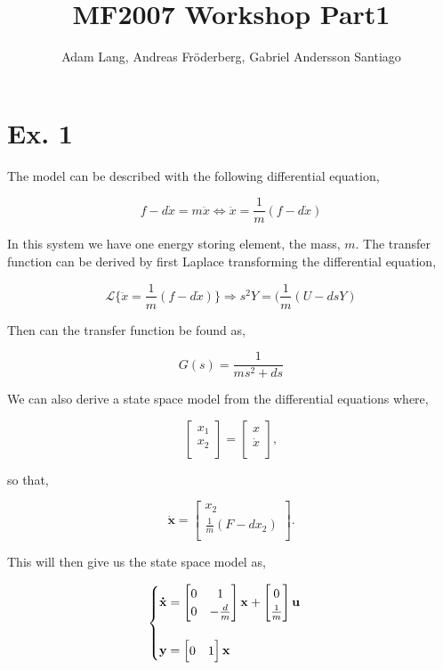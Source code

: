 \documentclass[12pt,a4paper]{article}
\title{MF2007 Workshop Part1}
\author{Adam Lang, Andreas Fr\"{o}derberg, Gabriel Andersson Santiago}
\newcounter{eq}
\newcommand{\eq}[1]{
\begin{equation}
        #1
\end{equation}
    }
\begin{document}
\maketitle
\section{Ex. 1}
  The model can be described with the following differential equation,
  \eq{
  f-d\dot{x}=m\ddot{x}\Leftrightarrow \ddot{x}=\frac{1}{m}(f-d\dot{x})
  }
  In this system we have one energy storing element, the mass, $m$. The
  transfer function can be derived by first Laplace transforming the
  differential equation,
  \eq{
  \mathscr{L}\{\ddot{x}=\frac{1}{m}(f-d\dot{x})\}\Rightarrow s^2Y=(\frac{1}{m}(U-dsY)
  }
  Then can the transfer function be found as,
  \eq{
  G(s)=\frac{1}{ms^2+ds}
  }
  We can also derive a state space model from the differential equations
  where,
  \eq{
  \begin{bmatrix}
    x_1 \\
    x_2 \\
  \end{bmatrix}
  =
  \begin{bmatrix}
    x \\
    \dot{x} \\
  \end{bmatrix},
  }
  so that, 
  \eq{
  \mathbf{\dot{x}}=
  \begin{bmatrix}
    x_2\\
    \frac{1}{m}(F-dx_2)\\
  \end{bmatrix}.
  }
  This will then give us the state space model as,
  \eq{
  \begin{cases}
  \mathbf{\dot{x}}=
  \begin{bmatrix}
    0 & 1 \\
    0 & -\frac{d}{m} \\
  \end{bmatrix}
  \mathbf{x}+
  \begin{bmatrix}
    0 \\
    \frac{1}{m} \\
  \end{bmatrix}
  \mathbf{u}\\
  \vspace{0.02cm} \\
  \mathbf{y}=
  \begin{bmatrix}
    0 & 1\\
  \end{bmatrix}
  \mathbf{x}
\end{cases}
  }
\end{document}
